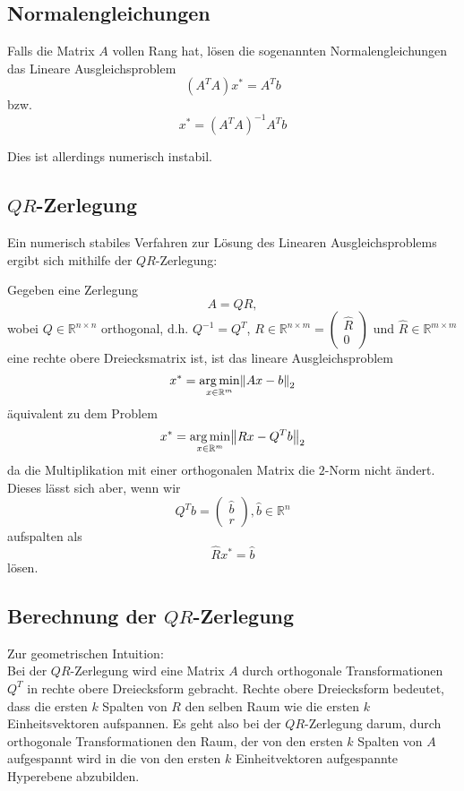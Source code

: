 \documentclass[a4paper,parskip=half*,DIV=7,fontsize=11pt]{scrartcl}
\DeclarePairedDelimiter\norm{\lVert}{\rVert}
\DeclareMathOperator*\argmin{arg\,min}
\begin{document}
\subsection{Normalengleichungen}

Falls die Matrix $A$ vollen Rang hat, lösen die sogenannten Normalengleichungen das Lineare Ausgleichsproblem
\[\left(A^TA\right)x^\ast = A^Tb\]
bzw.
\[x^\ast = \left(A^TA\right)^{-1}A^Tb\]

Dies ist allerdings numerisch instabil.

\subsection[QR-Zerlegung]{$QR$-Zerlegung}

Ein numerisch stabiles Verfahren zur Lösung des Linearen Ausgleichsproblems ergibt sich mithilfe der $QR$-Zerlegung:

Gegeben eine Zerlegung
\[A = QR,\]
wobei $Q \in \mathbb{R}^{n \times n}$ orthogonal, d.h. $Q^{-1} = Q^T$, $R \in \mathbb{R}^{n \times m} = \begin{pmatrix} \hat{R}	\\	0 \end{pmatrix}$ und $\hat{R} \in \mathbb{R}^{m \times m}$ eine rechte obere Dreiecksmatrix ist, ist das lineare Ausgleichsproblem
\[x^\ast = \argmin_{x \in \mathbb{R}^{m}} \norm*{Ax-b}_2\]
äquivalent zu dem Problem
\[x^\ast = \argmin_{x \in \mathbb{R}^m} \norm*{Rx-Q^Tb}_2\]
da die Multiplikation mit einer orthogonalen Matrix die $2$-Norm nicht ändert. Dieses lässt sich aber, wenn wir
\[Q^Tb = \begin{pmatrix}
	\hat{b}	\\	r
\end{pmatrix}, \hat{b} \in \mathbb{R}^n\]
aufspalten als
\[\hat{R}x^\ast = \hat{b}\]
lösen.

\subsection[Berechnung der QR-Zerlegung]{Berechnung der $QR$-Zerlegung}

Zur geometrischen Intuition:	\\
Bei der $QR$-Zerlegung wird eine Matrix $A$ durch orthogonale Transformationen $Q^T$ in rechte obere Dreiecksform gebracht. Rechte obere Dreiecksform bedeutet, dass die ersten $k$ Spalten von $R$ den selben Raum wie die ersten $k$ Einheitsvektoren aufspannen. Es geht also bei der $QR$-Zerlegung darum, durch orthogonale Transformationen den Raum, der von den ersten $k$ Spalten von $A$ aufgespannt wird in die von den ersten $k$ Einheitvektoren aufgespannte Hyperebene abzubilden.
\end{document}
